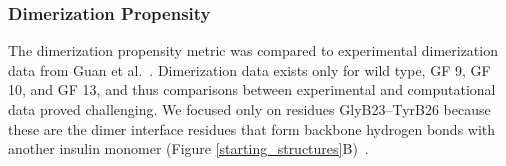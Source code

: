 \documentclass[9pt]{elife}
\providecommand{\DIFdelend}{} %
\begin{document}


\DIFdelend \subsubsection{Dimerization Propensity}
The dimerization propensity metric was compared to experimental dimerization data from Guan et al.~\cite{guan2018chemically}. Dimerization data exists only for wild type, GF 9, GF 10, and GF 13, and thus comparisons between experimental and computational data proved challenging. We focused only on residues GlyB23--TyrB26 because these are the dimer interface residues that form backbone hydrogen bonds with another insulin monomer (Figure \ref{starting_structures}B)~\cite{timofeev2010x, harding1966crystal, antolikova2011dimerinterface}. 
\end{document}
